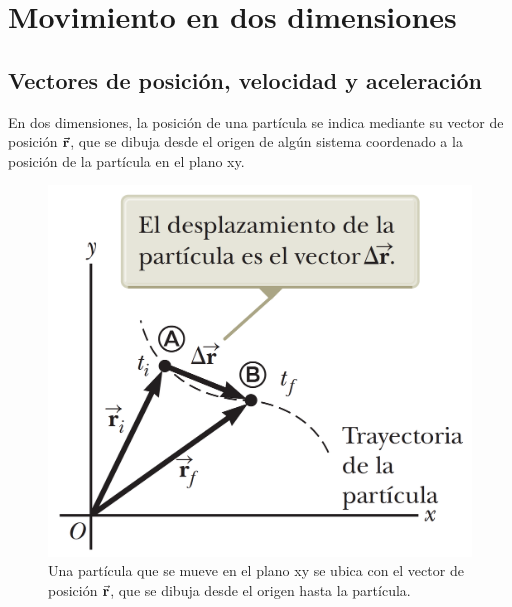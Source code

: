 \section{Movimiento en dos dimensiones}
  \subsection{Vectores de posición, velocidad y aceleración}
    \PN En dos dimensiones, la posición de una partícula se indica mediante su vector de posición $\vec{\mathbf{r}}$, que se
    dibuja desde el origen de algún sistema coordenado a la posición de la partícula en el plano xy.

    \begin{figure}[H]
      \centering
      \includegraphics[scale=0.2]{1/graphics_4/figure_0}
      \caption{Una partícula que se mueve en el plano xy se ubica con el vector de posición $\vec{\mathbf{r}}$, que se dibuja
      desde el origen hasta la partícula.}
    \end{figure}

